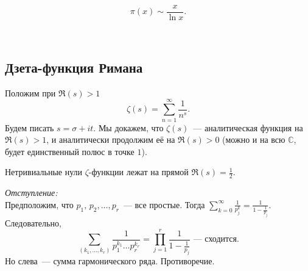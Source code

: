 \begin{theorem} \label{l1_thm2}
	$$\pi(x) \sim \frac{x}{\ln x}.$$
\end{theorem}~\\

\subsection{Дзета-функция Римана}
Положим при $\Re(s) > 1$
$$\zeta(s) = \sum_{n=1}^\infty \frac{1}{n^s}.$$
Будем писать $s = \sigma + it$. Мы докажем, что $\zeta(s)$ — аналитическая функция на $\Re(s) > 1$, и аналитически продолжим её на $\Re(s) > 0$ (можно и на всю $\mathbb{C}$, будет единственный полюс в точке $1$).

\begin{theorem} \label{l1_RiemannHypothesis}
	Нетривиальные нули $\zeta$-функции лежат на прямой $\Re(s) = \frac{1}{2}$.
\end{theorem}

\textit{Отступление:}\\
	Предположим, что $p_1,\,p_2,\dots,p_r$ — все простые. Тогда
	$\displaystyle \sum\limits_{k=0}^\infty \frac{1}{p_j^k} = \frac{1}{1-\frac{1}{p_j}}$. Следовательно,
	$$\sum_{(k_1,\dots,k_r)} \frac{1}{p_1^{k_1} \dots p_r^{k_r}} = \prod_{j=1}^r \frac{1}{1-\frac{1}{p_j}} \text{ — сходится}.$$
	Но слева — сумма гармонического ряда. Противоречие.